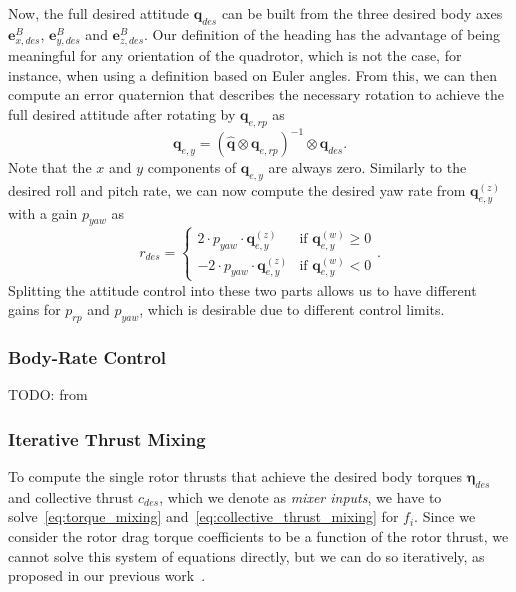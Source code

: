 \documentclass[10pt,a4paper,fleqn]{article}
\newcommand{\bVec}[1]{\mathbf{#1}}
\newcommand{\bfr}[0]{\ensuremath{B}} %
\newcommand{\bodytorque}[0]{\eta}
\newcommand{\bodytorques}[0]{\boldsymbol{\bodytorque}}
\newcommand{\thrust}[0]{c} %
\newcommand{\rotthrust}[1]{f_{#1}}
\begin{document}
%
Now, the full desired attitude $\bVec{q}_{des}$ can be built from the three desired body axes $\bVec{e}_{x,des}^{\bfr}$, $\bVec{e}_{y,des}^{\bfr}$ and $\bVec{e}_{z,des}^{\bfr}$.
Our definition of the heading has the advantage of being meaningful for any orientation of the quadrotor, which is not the case, for instance, when using a definition based on Euler angles.
From this, we can then compute an error quaternion that describes the necessary rotation to achieve the full desired attitude after rotating by $\bVec{q}_{e,rp}$ as
%
\begin{equation}
	\bVec{q}_{e,y} = (\hat{\bVec{q}} \otimes \bVec{q}_{e,rp})^{-1} \otimes \bVec{q}_{des}.
\end{equation}
%
Note that the $x$ and $y$ components of $\bVec{q}_{e,y}$ are always zero.
Similarly to the desired roll and pitch rate, we can now compute the desired yaw rate from $\bVec{q}_{e,y}^{(z)}$ with a gain $p_{yaw}$ as
%
\begin{equation}
	r_{des} = \begin{cases} 2 \cdot p_{yaw} \cdot \bVec{q}_{e,y}^{(z)} &\mbox{if } \bVec{q}_{e,y}^{(w)} \geq 0 \\
						- 2 \cdot p_{yaw} \cdot \bVec{q}_{e,y}^{(z)} &\mbox{if } \bVec{q}_{e,y}^{(w)} < 0 
					\end{cases}.
\end{equation}
%
Splitting the attitude control into these two parts allows us to have different gains for $p_{rp}$ and $p_{yaw}$, which is desirable due to different control limits.

\subsubsection{Body-Rate Control}

TODO: from \cite{Faessler17ral}

\subsubsection{Iterative Thrust Mixing} \label{sec:mixer}

To compute the single rotor thrusts that achieve the desired body torques $\bodytorques_{des}$ and collective thrust $\thrust_{des}$, which we denote as \emph{mixer inputs}, we have to solve~\eqref{eq:torque_mixing} and~\eqref{eq:collective_thrust_mixing} for $\rotthrust{i}$.
Since we consider the rotor drag torque coefficients to be a function of the rotor thrust, we cannot solve this system of equations directly, but we can do so iteratively, as proposed in our previous work~\cite{Faessler17ral}.
\end{document}
